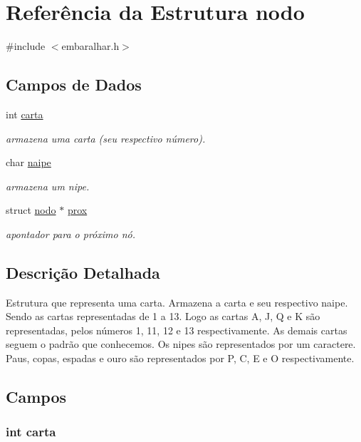 \hypertarget{structnodo}{
\section{Referência da Estrutura nodo}
\label{structnodo}
}


{\ttfamily \#include $<$embaralhar.h$>$}

\subsection*{Campos de Dados}
\begin{DoxyCompactItemize}
\item 
int \hyperlink{structnodo_a0d153279003388933e082f40da4a3702}{carta}
\begin{DoxyCompactList}\small\item\em armazena uma carta (seu respectivo número). \item\end{DoxyCompactList}\item 
char \hyperlink{structnodo_aba763958bee1abb2961d0d2e82f8cdfb}{naipe}
\begin{DoxyCompactList}\small\item\em armazena um nipe. \item\end{DoxyCompactList}\item 
struct \hyperlink{structnodo}{nodo} $\ast$ \hyperlink{structnodo_a486ad5c9b955ff42eaf8fbf3330e4c75}{prox}
\begin{DoxyCompactList}\small\item\em apontador para o próximo nó. \item\end{DoxyCompactList}\end{DoxyCompactItemize}


\subsection{Descrição Detalhada}
Estrutura que representa uma carta. Armazena a carta e seu respectivo naipe. Sendo as cartas representadas de 1 a 13. Logo as cartas A, J, Q e K são representadas, pelos números 1, 11, 12 e 13 respectivamente. As demais cartas seguem o padrão que conhecemos. Os nipes são representados por um caractere. Paus, copas, espadas e ouro são representados por P, C, E e O respectivamente. 

\subsection{Campos}
\hypertarget{structnodo_a0d153279003388933e082f40da4a3702}{
\subsubsection[{carta}]{\setlength{\rightskip}{0pt plus 5cm}int {\bf carta}}}
\label{structnodo_a0d153279003388933e082f40da4a3702}


